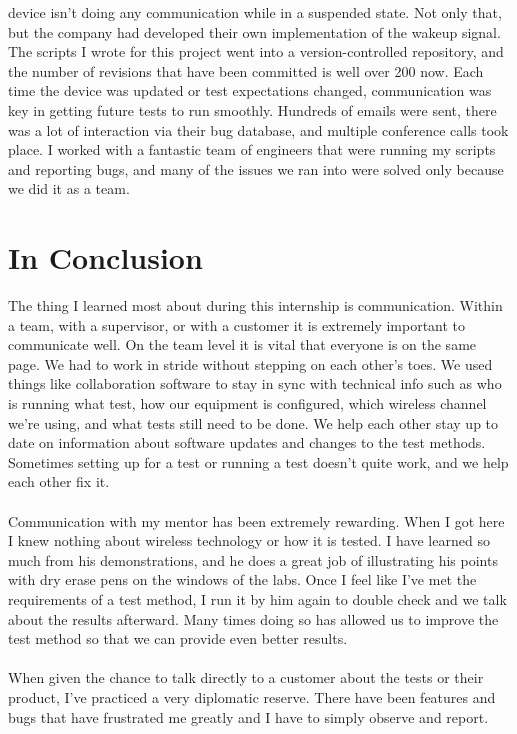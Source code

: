 \documentclass{article}
\begin{document}
device isn't doing any communication while in a suspended state. Not only that,
but the company had developed their own implementation of the wakeup signal.
The scripts I wrote for this project went into a version-controlled repository,
and the number of revisions that have been committed is well over 200 now.
Each time the device was updated or test expectations changed, communication
was key in getting future tests to run smoothly. Hundreds of emails were sent,
there was a lot of interaction via their bug database, and multiple conference
calls took place. I worked with a fantastic team of engineers that were running
my scripts and reporting bugs, and many of the issues we ran into were solved
only because we did it as a team.

\section*{In Conclusion}
The thing I learned most about during this internship is communication. Within a
team, with a supervisor, or with a customer it is extremely important to
communicate well. On the team level it is vital that everyone is
on the same page. We had to work in stride without stepping on each other's
toes. We used things like collaboration software to stay in sync with technical
info such as who is running what test, how our equipment is configured, which
wireless channel we're using, and what tests still need to be done. We help
each other stay up to date on information about software updates and changes to
the test methods. Sometimes setting up for a test or running a test doesn't
quite work, and we help each other fix it.\\
\\
Communication with my mentor has been extremely rewarding. When I got here I
knew nothing about wireless technology or how it is tested. I have learned so
much from his demonstrations, and he does a great job of illustrating his points
with dry erase pens on the windows of the labs. Once I feel like I've met the
requirements of a test method, I run it by him again to double check and we talk
about the results afterward. Many times doing so has allowed us to improve the
test method so that we can provide even better results.\\
\\
When given the chance to talk directly to a customer about the tests or their
product, I've practiced a very diplomatic reserve. There have been features and
bugs that have frustrated me greatly and I have to simply observe and report.
\end{document}
